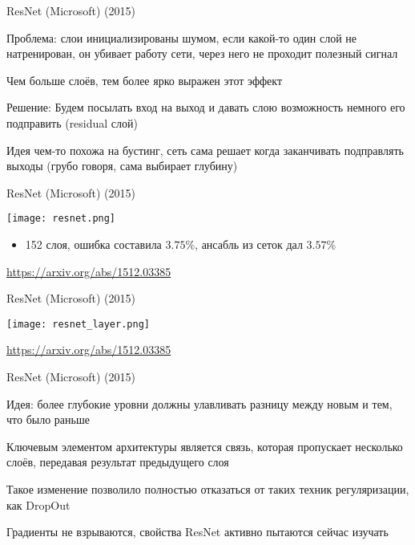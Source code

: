 \documentclass[notes,12pt, aspectratio=169]{beamer}
\newenvironment{wideitemize}{\itemize\addtolength{\itemsep}{10pt}}{\enditemize}
\begin{document}
\begin{frame}{ResNet (Microsoft) (2015)}
\begin{wideitemize}
	\item  \alert{Проблема:} слои инициализированы шумом, если какой-то один слой не натренирован, он убивает работу сети, через него не проходит полезный сигнал 
	\item Чем больше слоёв, тем более ярко выражен этот эффект 
	\item \alert{Решение:} Будем посылать вход на выход и давать слою возможность немного его подправить (residual слой)
	\item Идея чем-то похожа на бустинг, сеть сама решает когда заканчивать подправлять выходы (грубо говоря, сама выбирает глубину)
\end{wideitemize}
\end{frame}


\begin{frame}{ResNet (Microsoft) (2015)}
\begin{center}
	\texttt{[image: resnet.png]}
\end{center}
\begin{itemize}
	\item 152 слоя, ошибка составила $3.75\%$, ансабль из сеток дал $3.57\%$
\end{itemize}
\vfill %
\footnotesize
\color{blue} \url{https://arxiv.org/abs/1512.03385}
\end{frame}


\begin{frame}{ResNet (Microsoft) (2015)}
\begin{center}
	\texttt{[image: resnet\_layer.png]}
\end{center}
\vfill %
\footnotesize
\color{blue} \url{https://arxiv.org/abs/1512.03385}
\end{frame}


\begin{frame}{ResNet (Microsoft) (2015)}
\begin{wideitemize}
	\item \alert{Идея:} более глубокие уровни должны улавливать разницу между новым и тем, что было раньше 
	
	\item Ключевым элементом архитектуры является связь, которая пропускает несколько слоёв, передавая результат предыдущего слоя
	
	\item Такое изменение позволило полностью отказаться от таких техник регуляризации, как DropOut
	
	\item Градиенты не взрываются, свойства ResNet активно пытаются сейчас изучать
\end{wideitemize}
\end{frame}
\end{document}
